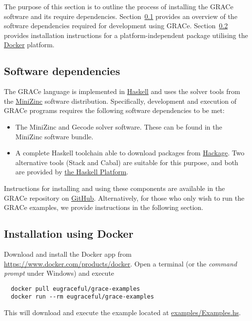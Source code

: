 
The purpose of this section is to outline the process of installing
the GRACe software and its require dependencies.
%
Section~\ref{install-overview} provides an overview of the software
dependencies required for development using GRACe.
%
Section~\ref{install-docker} provides installation instructions for a
platform-independent package utilising the
\href{https://www.docker.com/}{Docker}
platform.


\subsection{Software dependencies}
\label{install-overview}

The GRACe language is implemented in
\href{https://www.haskell.org/}{Haskell} and uses the solver tools
from the \href{http://www.minizinc.org/}{MiniZinc} software
distribution.
%
Specifically, development and execution of GRACe programs requires the
following software dependencies to be met:

\begin{itemize}
\item The MiniZinc and Gecode solver software.
%
  These can be found in the MiniZinc software bundle.
%
\item A complete Haskell toolchain able to download packages from
  \href{https://hackage.haskell.org/}{Hackage}.
%
  Two alternative tools (Stack and Cabal) are suitable for this
  purpose, and both are provided by
  \href{https://www.haskell.org/platform/}{the Haskell Platform}.
\end{itemize}

Instructions for installing and using these components are available
in the {GRACe} repository on
\href{https://github.com/GRACeFUL-project/%
  GRACe/blob/master/doc/INSTALL.md}{GitHub}.
%
Alternatively, for those who only wish to run the GRACe
examples, we provide instructions in the following section.


\subsection{Installation using Docker}
\label{install-docker}

Download and install the Docker app from \url{https://www.docker.com/products/docker}.
%
Open a terminal (or the \emph{command prompt} under Windows) and
execute
\begin{verbatim}
  docker pull eugraceful/grace-examples
  docker run --rm eugraceful/grace-examples
\end{verbatim}

This will download and execute the example located at
\href{https://github.com/GRACeFUL-project/GRACe/blob/master/examples/Examples.hs}{examples/Examples.hs}.
